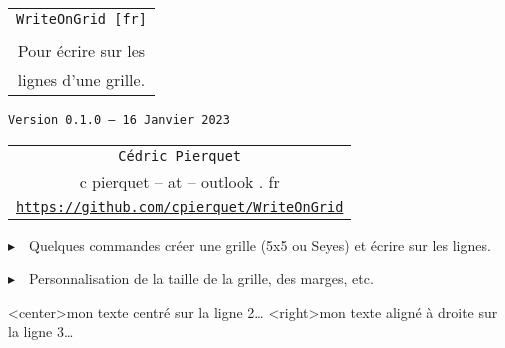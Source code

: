 \documentclass[a4paper]{article}
\def\TPversion{0.1.0}
\def\TPdate{16 Janvier 2023}
\begin{document}
\pagestyle{fancy}

\thispagestyle{empty}

\vspace{2cm}

\begin{center}
	\begin{minipage}{0.75\linewidth}
	\begin{tcolorbox}[colframe=yellow,colback=yellow!15]
		\begin{center}
			\begin{tabular}{c}
				{\Huge \texttt{WriteOnGrid [fr]}}\\
				\\
				{\LARGE Pour écrire sur les} \\
				{\LARGE lignes d'une grille.}
			\end{tabular}
			
			\medskip
			
			{\small \texttt{Version \TPversion{} -- \TPdate}}
		\end{center}
	\end{tcolorbox}
\end{minipage}
\end{center}

\vspace{0.5cm}

\begin{center}
	\begin{tabular}{c}
	\texttt{Cédric Pierquet}\\
	{\ttfamily c pierquet -- at -- outlook . fr}\\
	\texttt{\url{https://github.com/cpierquet/WriteOnGrid}}
\end{tabular}
\end{center}

\vspace{0.5cm}

{$\blacktriangleright$~~Quelques commandes créer une grille (5x5 ou Seyes) et écrire \og sur \fg{} les lignes.}

\smallskip

{$\blacktriangleright$~~Personnalisation de la taille de la grille, des marges, etc.}

\vspace{1cm}

\begin{center}
	\begin{EnvQuadrillage}[NbCarreaux=22x8]
	\EcrireLigne<center>{mon texte centré sur la ligne 2\ldots}
	\EcrireLigne<right>{mon texte aligné à droite sur la ligne 3\ldots}
	\PasseLigne
\end{EnvQuadrillage}
\end{center}
\end{document}
